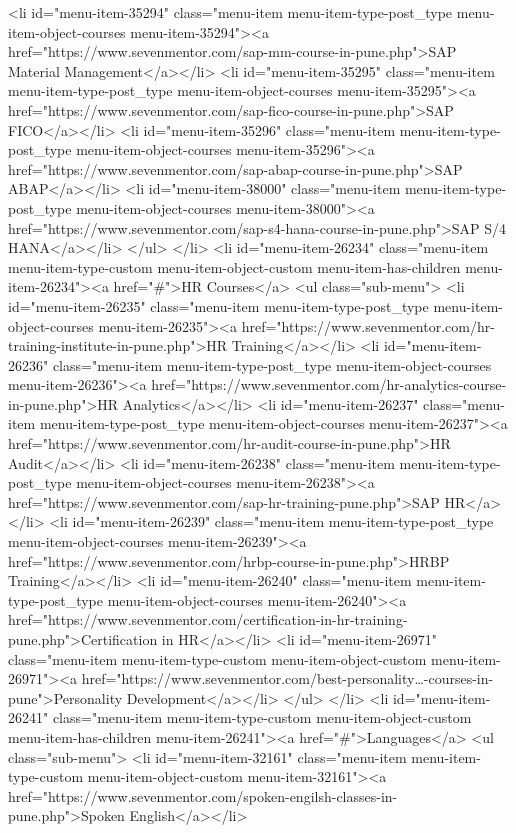 {<li id="menu-item-35294" class="menu-item menu-item-type-post_type menu-item-object-courses menu-item-35294"><a href="https://www.sevenmentor.com/sap-mm-course-in-pune.php">SAP Material Management</a></li>
<li id="menu-item-35295" class="menu-item menu-item-type-post_type menu-item-object-courses menu-item-35295"><a href="https://www.sevenmentor.com/sap-fico-course-in-pune.php">SAP FICO</a></li>
<li id="menu-item-35296" class="menu-item menu-item-type-post_type menu-item-object-courses menu-item-35296"><a href="https://www.sevenmentor.com/sap-abap-course-in-pune.php">SAP ABAP</a></li>
<li id="menu-item-38000" class="menu-item menu-item-type-post_type menu-item-object-courses menu-item-38000"><a href="https://www.sevenmentor.com/sap-s4-hana-course-in-pune.php">SAP S/4 HANA</a></li>
</ul>
</li>
<li id="menu-item-26234" class="menu-item menu-item-type-custom menu-item-object-custom menu-item-has-children menu-item-26234"><a href="#">HR Courses</a>
<ul class="sub-menu">
<li id="menu-item-26235" class="menu-item menu-item-type-post_type menu-item-object-courses menu-item-26235"><a href="https://www.sevenmentor.com/hr-training-institute-in-pune.php">HR Training</a></li>
<li id="menu-item-26236" class="menu-item menu-item-type-post_type menu-item-object-courses menu-item-26236"><a href="https://www.sevenmentor.com/hr-analytics-course-in-pune.php">HR Analytics</a></li>
<li id="menu-item-26237" class="menu-item menu-item-type-post_type menu-item-object-courses menu-item-26237"><a href="https://www.sevenmentor.com/hr-audit-course-in-pune.php">HR Audit</a></li>
<li id="menu-item-26238" class="menu-item menu-item-type-post_type menu-item-object-courses menu-item-26238"><a href="https://www.sevenmentor.com/sap-hr-training-pune.php">SAP HR</a></li>
<li id="menu-item-26239" class="menu-item menu-item-type-post_type menu-item-object-courses menu-item-26239"><a href="https://www.sevenmentor.com/hrbp-course-in-pune.php">HRBP Training</a></li>
<li id="menu-item-26240" class="menu-item menu-item-type-post_type menu-item-object-courses menu-item-26240"><a href="https://www.sevenmentor.com/certification-in-hr-training-pune.php">Certification in HR</a></li>
<li id="menu-item-26971" class="menu-item menu-item-type-custom menu-item-object-custom menu-item-26971"><a href="https://www.sevenmentor.com/best-personality…-courses-in-pune">Personality Development</a></li>
</ul>
</li>
<li id="menu-item-26241" class="menu-item menu-item-type-custom menu-item-object-custom menu-item-has-children menu-item-26241"><a href="#">Languages</a>
<ul class="sub-menu">
<li id="menu-item-32161" class="menu-item menu-item-type-custom menu-item-object-custom menu-item-32161"><a href="https://www.sevenmentor.com/spoken-engilsh-classes-in-pune.php">Spoken English</a></li>
}
